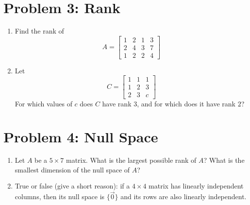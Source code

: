 \documentclass[11pt]{article}
\begin{document}
\section*{Problem 3: Rank}
\begin{enumerate}
    \item[(a)] Find the rank of
    \[
    A=\begin{bmatrix}
        1 & 2 & 1 & 3\\
        2 & 4 & 3 & 7\\
        1 & 2 & 2 & 4
    \end{bmatrix}
    \]
    \item[(b)] Let
    \[
    C=\begin{bmatrix}
        1 & 1 & 1\\
        1 & 2 & 3\\
        2 & 3 & c
    \end{bmatrix}
    \]
    For which values of $c$ does $C$ have rank $3$, and for which does it have rank $2$?
\end{enumerate}

\section*{Problem 4: Null Space}
\begin{enumerate}
    \item[(a)] Let $A$ be a $5\times 7$ matrix. What is the largest possible rank of $A$? What is the smallest dimension of the null space of $A$?
    \item[(b)] True or false (give a short reason): if a $4\times 4$ matrix has linearly independent columns, then its null space is $\{\vec{0}\}$ and its rows are also linearly independent.
\end{enumerate}
\end{document}
